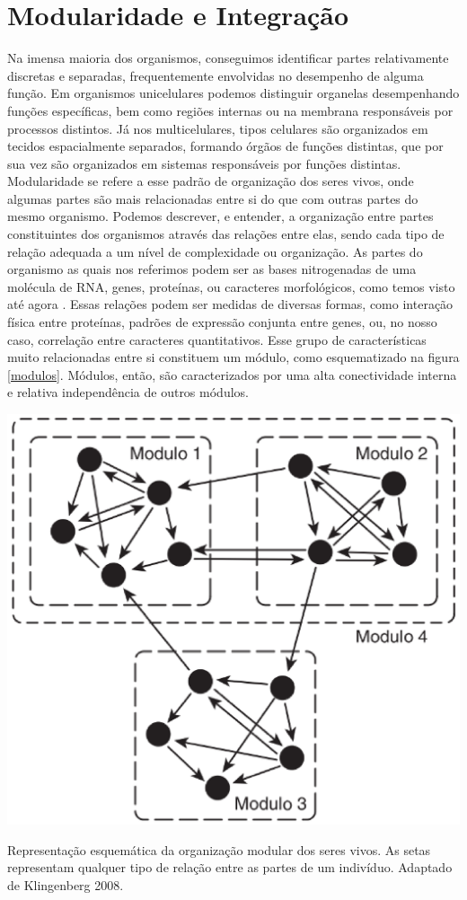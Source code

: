\documentclass[portuges,]{tufte-handout}
\begin{document}
\section{Modularidade e
Integração}\label{modularidade-e-integrauxe7uxe3o}

Na imensa maioria dos organismos, conseguimos identificar partes
relativamente discretas e separadas, frequentemente envolvidas no
desempenho de alguma função. Em organismos unicelulares podemos
distinguir organelas desempenhando funções específicas, bem como regiões
internas ou na membrana responsáveis por processos distintos. Já nos
multicelulares, tipos celulares são organizados em tecidos espacialmente
separados, formando órgãos de funções distintas, que por sua vez são
organizados em sistemas responsáveis por funções distintas. Modularidade
se refere a esse padrão de organização dos seres vivos, onde algumas
partes são mais relacionadas entre si do que com outras partes do mesmo
organismo. Podemos descrever, e entender, a organização entre partes
constituintes dos organismos através das relações entre elas, sendo cada
tipo de relação adequada a um nível de complexidade ou organização. As
partes do organismo as quais nos referimos podem ser as bases
nitrogenadas de uma molécula de RNA, genes, proteínas, ou caracteres
morfológicos, como temos visto até agora \cite{Wagner2007}. Essas
relações podem ser medidas de diversas formas, como interação física
entre proteínas, padrões de expressão conjunta entre genes, ou, no nosso
caso, correlação entre caracteres quantitativos. Esse grupo de
características muito relacionadas entre si constituem um módulo, como
esquematizado na figura \ref{modulos}. Módulos, então, são
caracterizados por uma alta conectividade interna e relativa
independência de outros módulos.

\begin{marginfigure}
\includegraphics{./figuras/modulos.png}
\caption{Representação esquemática da organização modular dos seres
vivos. As setas representam qualquer tipo de relação entre as partes de
um indivíduo. Adaptado de Klingenberg 2008.}
\label{modulos}
\end{marginfigure}
\end{document}
